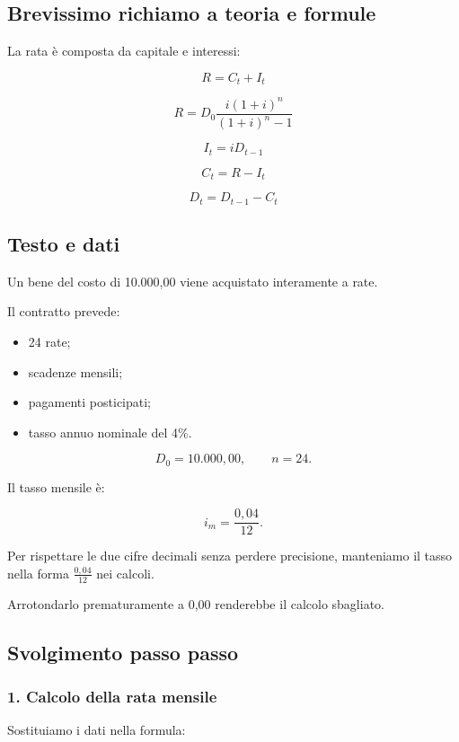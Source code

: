 \subsection*{Brevissimo richiamo a teoria e formule}

\noindent La rata è composta
da capitale e interessi:

\[
\boxed{R=C_t+I_t}
\]

\[
\boxed{
R=
D_0
\frac{i(1+i)^n}
{(1+i)^n-1}
}
\]

\[
\boxed{I_t=iD_{t-1}}
\]

\[
\boxed{C_t=R-I_t}
\]

\[
\boxed{D_t=D_{t-1}-C_t}
\]


\subsection*{Testo e dati}

\noindent Un bene del costo di 10.000,00
viene acquistato interamente a rate.

\noindent Il contratto prevede:

\begin{itemize}
    \item 24 rate;
    \item scadenze mensili;
    \item pagamenti posticipati;
    \item tasso annuo nominale del 4\%.
\end{itemize}

\[
D_0=10.000{,}00,
\qquad
n=24.
\]

\noindent Il tasso mensile è:

\[
i_m=\frac{0{,}04}{12}.
\]

\noindent Per rispettare le due cifre decimali
senza perdere precisione,
manteniamo il tasso nella forma
$\frac{0{,}04}{12}$ nei calcoli.

\noindent Arrotondarlo prematuramente
a 0,00 renderebbe il calcolo sbagliato.


\subsection*{Svolgimento passo passo}

\subsubsection*{1. Calcolo della rata mensile}

\noindent Sostituiamo i dati
nella formula:


